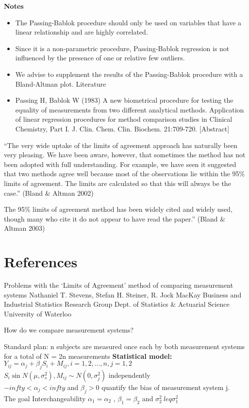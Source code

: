 \documentclass[MAIN.tex]{subfiles}
\begin{document}
\textbf{Notes}
\begin{itemize}
\item The Passing-Bablok procedure should only be used on variables that have a linear relationship and are highly correlated.
\item Since it is a non-parametric procedure, Passing-Bablok regression is not influenced by the presence of one or relative few outliers.
\item We advise to supplement the results of the Passing-Bablok procedure with a Bland-Altman plot.
Literature

\item Passing H, Bablok W (1983) A new biometrical procedure for testing the equality of measurements from two different analytical methods. Application of linear regression procedures for method comparison studies in Clinical Chemistry, Part I. J. Clin. Chem. Clin. Biochem. 21:709-720. [Abstract]
\end{itemize}

 “The very wide uptake of the limits of agreement approach has naturally been very pleasing.
We have been aware, however, that sometimes the method has not been adopted with full
understanding. For example, we have seen it suggested that two methods agree well
because most of the observations lie within the 95\% limits of agreement. The limits are
calculated so that this will always be the case.” (Bland \& Altman 2002)

The 95\% limits of agreement method has been widely cited and widely used, though many
who cite it do not appear to have read the paper.” (Bland \& Altman 2003)

\section{References}
Problems with the ‘Limits of Agreement’
method of comparing measurement systems
Nathaniel T. Stevens, Stefan H. Steiner, R. Jock MacKay
Business and Industrial Statistics Research Group
Dept. of Statistics \& Actuarial Science
University of Waterloo



How do we compare measurement systems?


Standard plan: n subjects are measured once each by both measurement systems for a total
of N = 2n measurements
\textbf{Statistical model:}
\\$Y_{ij} = \alpha_j + \beta_jS_i+M_{ij}, i=1,2,\ldots,n, j=1,2$
\\ $S_i \sin N(\mu, \sigma^2_s), M_{ij} \sim N(0,\sigma^2_j) $ independently
\\$ -infty < \alpha_j < infty$ and $\beta_j>0$ quantify the bias of measurement system j.
\\ The goal
Interchangeability $\alpha_1 = \alpha_2$ , $\beta_1 = \beta_2$ and $\sigma^2_2 \ leq \sigma^2_1$
\end{document}
